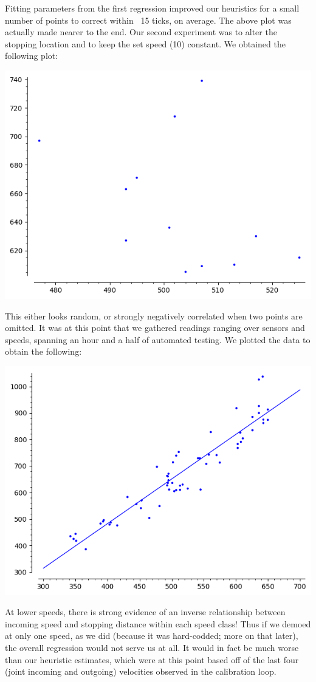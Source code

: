 \documentclass{amsart} \usepackage{amsmath} \usepackage{upgreek}
\begin{document}
Fitting parameters from the first regression improved our heuristics for a small number of points to correct within ~15 ticks, on average. The above plot was actually made nearer to the end. Our second experiment was to alter the stopping location and to keep the set speed (10) constant. We obtained the following plot:
\begin{center}
\includegraphics[scale=0.5]{x10s}
\end{center}
This either looks random, or strongly negatively correlated when two points are omitted. It was at this point that we gathered readings ranging over sensors and speeds, spanning an hour and a half of automated testing. We plotted the data to obtain the following:
\begin{center}
\includegraphics[scale=0.5]{regression}
\end{center}
At lower speeds, there is strong evidence of an inverse relationship between incoming speed and stopping distance within each speed class! Thus if we demoed at only one speed, as we did (because it was hard-codded; more on that later), the overall regression would not serve us at all. It would in fact be much worse than our heuristic estimates, which were at this point based off of the last four (joint incoming and outgoing) velocities observed in the calibration loop.
\end{document}

